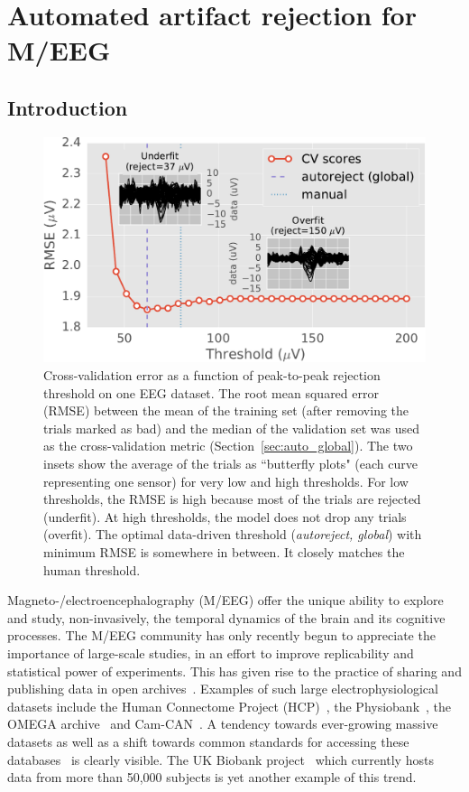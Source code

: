 \chapter{Automated artifact rejection for M/EEG}

\section{Introduction}
\label{sec:introduction}

\begin{figure}[t]
	\centering
	\includegraphics[width=0.55\linewidth]{figures/figure1.pdf}
    \caption[Cross-validation error as a function of peak-to-peak rejection threshold on one EEG dataset.]{Cross-validation error as a function of peak-to-peak rejection threshold on one EEG dataset. The root mean squared error (RMSE) between the mean of the training set (after removing the trials marked as bad) and the median of the validation set was used as the cross-validation metric (Section~\ref{sec:auto_global}). The two insets show the average of the trials as ``butterfly plots" (each curve representing one sensor) for very low and high thresholds. For low thresholds, the RMSE is high because most of the trials are rejected (underfit). At high thresholds, the model does not drop any trials (overfit). The optimal data-driven threshold (\emph{autoreject, global}) with minimum RMSE is somewhere in between. It closely matches the human threshold.}
    \label{fig:cross_val}
\end{figure}

Magneto-/electroencephalography (M/EEG) offer the unique ability to explore
and study, non-invasively, the temporal dynamics of the brain and its cognitive processes. The M/EEG community has only recently begun to appreciate the importance of large-scale studies, in an effort to improve replicability and statistical power of experiments. This has given rise to the practice of sharing and publishing data in open archives~\citep{gorgolewski2016practical}. Examples of such large electrophysiological datasets include the Human Connectome Project (HCP)~\citep{van2012human, larson2013adding}, the Physiobank~\citep{goldberger2000physiobank}, the OMEGA archive~\citep{niso2016omega} and Cam-CAN~\citep{taylor2015cambridge}. A tendency towards ever-growing massive datasets as well as a shift towards common standards for accessing these databases~\citep{gorgolewski2016brain,bigdely2013hierarchical} is clearly visible. The UK Biobank project~\citep{ollier2005uk} which currently hosts data from more than 50,000 subjects is yet another example of this trend.

